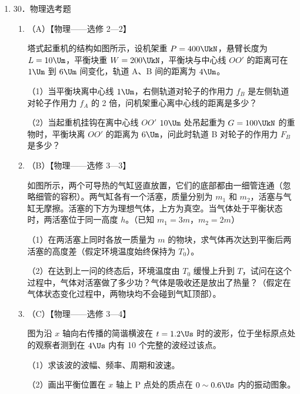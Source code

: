 \documentclass[\gkver]{gaokaozhenti}
\begin{document}
\begin{enumerate}
{
}

\item
30．物理选考题

\begin{enumerate}
	\item
	（A）【物理——选修 2—2】

	塔式起重机的结构如图所示，设机架重 $P=400\UkN$，悬臂长度为 $L=10\Um$，平衡块重 $W=200\UkN$，平衡块与中心线 $OO'$ 的距离可在 $1\Um$ 到 $6\Um$ 间变化，轨道 A、B 间的距离为 $4\Um$。

	（1）当平衡块离中心线 $1\Um$，右侧轨道对轮子的作用力 $f_{B}$ 是左侧轨道对轮子作用力 $f_{A}$ 的 2 倍，问机架重心离中心线的距离是多少？

	（2）当起重机挂钩在离中心线 $OO'$ $10\Um$ 处吊起重为 $G=100\UkN$ 的重物时，平衡块离 $OO'$ 的距离为 $6\Um$，问此时轨道 B 对轮子的作用力 $F_{B}$ 是多少？


	\item
	（B）【物理——选修 3—3】

	如图所示，两个可导热的气缸竖直放置，它们的底部都由一细管连通（忽略细管的容积）。两气缸各有一个活塞，质量分别为 $m_{1}$ 和 $m_{2}$，活塞与气缸无摩擦。活塞的下方为理想气体，上方为真空。当气体处于平衡状态时，两活塞位于同一高度 $h$。（已知 $m_{1}=3m$，$m_{2}=2m$）

	（1）在两活塞上同时各放一质量为 $m$ 的物块，求气体再次达到平衡后两活塞的高度差（假定环境温度始终保持为 $T_{0}$）。

	（2）在达到上一问的终态后，环境温度由 $T_{0}$ 缓慢上升到 $T$，试问在这个过程中，气体对活塞做了多少功？气体是吸收还是放出了热量？（假定在气体状态变化过程中，两物块均不会碰到气缸顶部）。


	\item
	（C）【物理——选修 3—4】

	图为沿 $x$ 轴向右传播的简谐横波在 $t=1.2\Us$ 时的波形，位于坐标原点处的观察者测到在 $4\Us$ 内有 10 个完整的波经过该点。

	（1）求该波的波幅、频率、周期和波速。

	（2）画出平衡位置在 $x$ 轴上 P 点处的质点在 $0\sim0.6\Us$ 内的振动图象。



\end{enumerate}
\end{enumerate}
\end{document}
